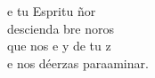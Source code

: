 \begin{cancion}%
	e tu Espritu ñor\\
	descienda bre noros   \\
	que nos e y de tu z  \\
	e nos déerzas paraaminar.\\
\end{cancion}%
